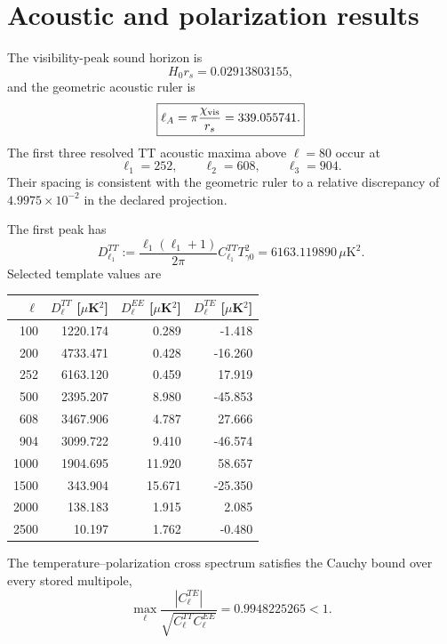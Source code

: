 \section{Acoustic and polarization results}

The visibility-peak sound horizon is
\begin{equation}
 H_0r_s=0.02913803155,
 \label{eq:pcmb-sound-horizon}
\end{equation}
and the geometric acoustic ruler is
\begin{equation}
 \boxed{
 \ell_A=\pi\frac{\chi_{\rm vis}}{r_s}=339.055741.}
 \label{eq:pcmb-acoustic-ruler}
\end{equation}
The first three resolved TT acoustic maxima above $\ell=80$ occur at
\begin{equation}
 \boxed{
 \ell_1=252,
 \qquad
 \ell_2=608,
 \qquad
 \ell_3=904.}
 \label{eq:pcmb-peak-positions}
\end{equation}
Their spacing is consistent with the geometric ruler to a relative discrepancy of $4.9975\times10^{-2}$ in the declared projection.

The first peak has
\begin{equation}
 \boxed{
 D_{\ell_1}^{TT}
 :=\frac{\ell_1(\ell_1+1)}{2\pi}C_{\ell_1}^{TT}T_{\gamma0}^2
 =6163.119890\,\mu\mathrm K^2.}
 \label{eq:pcmb-first-peak-amplitude}
\end{equation}
Selected template values are
\begin{center}
\begin{tabular}{rrrr}
\toprule
$\ell$ & $D_\ell^{TT}$ [$\mu$K$^2$] & $D_\ell^{EE}$ [$\mu$K$^2$] & $D_\ell^{TE}$ [$\mu$K$^2$]\\
\midrule
100 & 1220.174 & 0.289 & -1.418\\
200 & 4733.471 & 0.428 & -16.260\\
252 & 6163.120 & 0.459 & 17.919\\
500 & 2395.207 & 8.980 & -45.853\\
608 & 3467.906 & 4.787 & 27.666\\
904 & 3099.722 & 9.410 & -46.574\\
1000 & 1904.695 & 11.920 & 58.657\\
1500 & 343.904 & 15.671 & -25.350\\
2000 & 138.183 & 1.915 & 2.085\\
2500 & 10.197 & 1.762 & -0.480\\
\bottomrule
\end{tabular}
\end{center}
The temperature--polarization cross spectrum satisfies the Cauchy bound over every stored multipole,
\begin{equation}
 \max_\ell\frac{|C_\ell^{TE}|}{\sqrt{C_\ell^{TT}C_\ell^{EE}}}
 =0.9948225265<1.
 \label{eq:pcmb-te-cauchy}
\end{equation}

